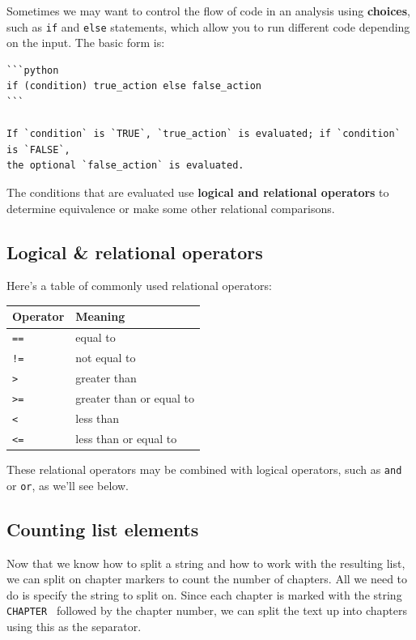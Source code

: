 \documentclass[
]{book}
\begin{document}
Sometimes we may want to control the flow of code in an analysis using \textbf{choices},
such as \texttt{if} and \texttt{else} statements, which allow you to run different code depending on the input.
The basic form is:

\begin{verbatim}
```python
if (condition) true_action else false_action
```

If `condition` is `TRUE`, `true_action` is evaluated; if `condition` is `FALSE`,
the optional `false_action` is evaluated.
\end{verbatim}

The conditions that are evaluated use \textbf{logical and relational operators} to determine equivalence or make some other relational comparisons.

\hypertarget{logical-relational-operators-1}{%
\subsection{Logical \& relational operators}\label{logical-relational-operators-1}}

Here's a table of commonly used relational operators:

\begin{longtable}[]{@{}ll@{}}
\toprule
Operator & Meaning\tabularnewline
\midrule
\endhead
\texttt{==} & equal to\tabularnewline
\texttt{!=} & not equal to\tabularnewline
\texttt{\textgreater{}} & greater than\tabularnewline
\texttt{\textgreater{}=} & greater than or equal to\tabularnewline
\texttt{\textless{}} & less than\tabularnewline
\texttt{\textless{}=} & less than or equal to\tabularnewline
\bottomrule
\end{longtable}

These relational operators may be combined with logical operators, such as \texttt{and} or \texttt{or}, as we'll see below.

\hypertarget{counting-list-elements}{%
\subsection{Counting list elements}\label{counting-list-elements}}

Now that we know how to split a string and how to work with the resulting list, we can split on chapter markers to count the number of chapters. All we need to do is specify the string to split on. Since each chapter is marked with the string \texttt{\textquotesingle{}CHAPTER\ \textquotesingle{}} followed by the chapter number, we can split the text up into chapters using this as the separator.
\end{document}
